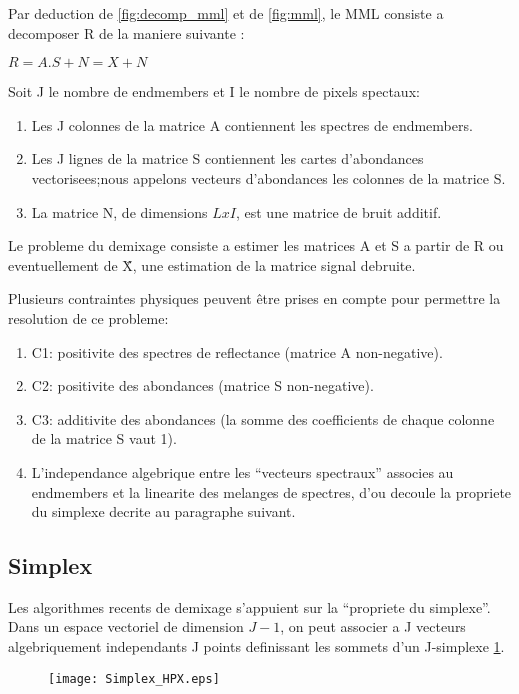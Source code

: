 Par deduction de \ref{fig:decomp_mml} et de \ref{fig:mml}, le MML consiste a decomposer R
de la maniere suivante : 
\begin{center}
$R= A.S + N = X + N$
\end{center}

Soit J le nombre de endmembers et I le nombre de pixels spectaux: 
\begin{enumerate}
\item{Les J colonnes de la matrice A contiennent les spectres de endmembers.}
\item{Les J lignes de la matrice S contiennent les cartes d'abondances
vectorisees;nous appelons vecteurs d'abondances les colonnes de la
matrice S.}
\item{La matrice N, de dimensions $LxI$, est une matrice de bruit
additif.}
\end{enumerate}

   

Le probleme du demixage consiste a estimer les matrices A et S a
partir de R ou eventuellement de \"X, une estimation de la matrice signal
debruite.

Plusieurs contraintes physiques peuvent être prises en
compte pour permettre la resolution de ce probleme: 
\begin{enumerate}
\item{C1: positivite
des spectres de reflectance (matrice A non-negative).}
\item{C2: positivite
des abondances (matrice S non-negative).}
\item{C3: additivite des
abondances (la somme des coefficients de chaque colonne de la matrice
S vaut 1).}
\item{L'independance algebrique entre les ``vecteurs spectraux''
associes au endmembers et la linearite des melanges de spectres, d'ou
decoule la propriete du simplexe decrite au paragraphe suivant.}
\end{enumerate}

\subsection{Simplex}  
Les algorithmes recents de demixage s'appuient sur la ``propriete du
simplexe''. Dans un espace vectoriel de dimension $J-1$, on peut
associer a J vecteurs algebriquement independants J points definissant
les sommets d'un J-simplexe \ref{fig:simplex}.

\begin{figure}[h]
  \centering
  \texttt{[image: Simplex\_HPX.eps]}
  \label{fig:simplex}
\end{figure}

